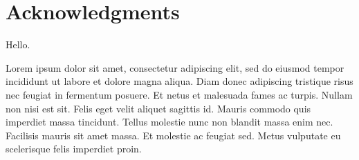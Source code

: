 
\chapter*{Acknowledgments}
Hello.

Lorem ipsum dolor sit amet, consectetur adipiscing elit, sed do eiusmod tempor incididunt ut labore et dolore magna aliqua. Diam donec adipiscing tristique risus nec feugiat in fermentum posuere. Et netus et malesuada fames ac turpis. Nullam non nisi est sit. Felis eget velit aliquet sagittis id. Mauris commodo quis imperdiet massa tincidunt. Tellus molestie nunc non blandit massa enim nec. Facilisis mauris sit amet massa. Et molestie ac feugiat sed. Metus vulputate eu scelerisque felis imperdiet proin.

